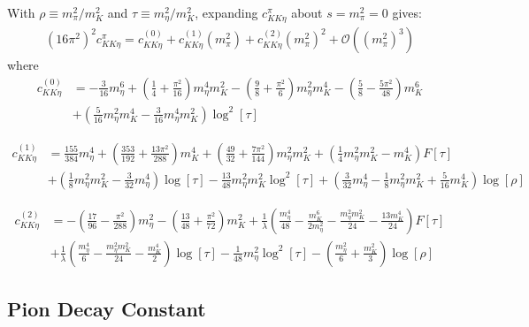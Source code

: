 \documentclass[12pt,a4paper]{article}
\begin{document}
With $\rho \equiv m_{\pi}^2/m_{K}^2$ and $\tau \equiv m_{\eta}^2/m_{K}^2$, expanding ${c}^{\pi}_{K K \eta}$ about $s = m_{\pi}^2 = 0$ gives:
\begin{align}
	(16 \pi^2)^2 {c}^{\pi}_{K K \eta} = {c}_{K K \eta}^{(0)} + {c}_{K K \eta}^{(1)} (m_{\pi}^2) + {c}_{K K \eta}^{(2)} (m_{\pi}^2)^2 + \mathcal{O}((m_{\pi}^2)^3)
\end{align}
where
\begin{align}
	{c}_{K K \eta}^{(0)} &= -\frac{3}{16} m_{\eta}^6 + \left(\frac{1}{4}+\frac{\pi ^2}{16}\right) m_{\eta}^4 m_{K}^2-\left(\frac{9}{8}+\frac{\pi^2}{6}\right) m_{\eta}^2 m_{K}^4 - \left(\frac{5}{8}-\frac{5\pi^2}{48}\right) m_{K}^6 \nonumber \\
	& + \left(\frac{5}{16} m_{\eta}^2 m_{K}^4 - \frac{3}{16} m_{\eta}^4 m_{K}^2 \right) \log^2[\tau] 
\end{align}

\begin{align}
	{c}_{K K \eta}^{(1)} &= \frac{155}{384} m_{\eta}^4 + \left(\frac{353}{192}+\frac{13 \pi^2}{288}\right) m_{K}^4 + \left(\frac{49}{32}+\frac{7 \pi ^2}{144}\right) m_{\eta}^2 m_{K}^2 + \left(\frac{1}{4} m_{\eta}^2 m_{K}^2 - m_{K}^4\right) F[\tau]   \nonumber \\
	& + \left(\frac{1}{8} m_{\eta}^2 m_{K}^2 - \frac{3}{32} m_{\eta}^4 \right) \log[\tau] -\frac{13}{48} m_{\eta}^2 m_{K}^2 \log^2 [\tau] + \left(\frac{3}{32} m_{\eta}^4 - \frac{1}{8} m_{\eta}^2 m_{K}^2 +\frac{5}{16} m_{K}^4 \right) \log [\rho]
\end{align}

\begin{align}
	{c}_{K K \eta}^{(2)} &= -\left(\frac{17}{96}-\frac{\pi^2}{288}\right) m_{\eta}^2-\left(\frac{13}{48}+\frac{\pi^2}{72}\right) m_{K}^2 + \frac{1}{\lambda} \left(\frac{m_{\eta}^4}{48}-\frac{m_{K}^6}{2 m_{\eta}^2}-\frac{m_{\eta}^2 m_{K}^2}{24}-\frac{13 m_{K}^4}{24}\right) F[\tau] \nonumber \\
	& + \frac{1}{\lambda} \left(\frac{m_{\eta}^4}{6}-\frac{m_{\eta}^2 m_{K}^2}{24}-\frac{m_{K}^4}{2}\right) \log[\tau] - \frac{1}{48} m_{\eta}^2 \log^2[\tau] - \left(\frac{m_{\eta}^2}{6}+\frac{m_{K}^2}{3}\right) \log [\rho]
\end{align}



\subsection{Pion Decay Constant \label{SecPionDecayPhysical}}
\end{document}
